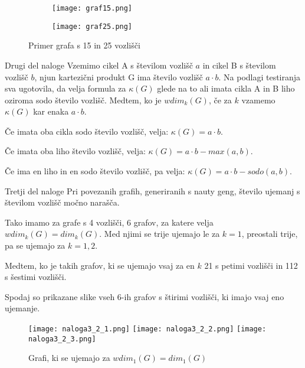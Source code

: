 \documentclass[12pt,a4paper]{amsart}
\makeatletter
\renewcommand\subsection{\@startsection{subsection}{2}%
  \z@{.5\linespacing\@plus.7\linespacing}{.5\linespacing}%
  {\normalfont\scshape}}
\theoremstyle{plain} %
\makeatother
\begin{document}
\bigskip

\bigskip
\begin{figure}[h]
    \centering
    \begin{subfigure}{0.25\textwidth}
    \centering
    \texttt{[image: graf15.png]}
    \end{subfigure}
    \begin{subfigure}{0.25\textwidth}
    \centering
    \texttt{[image: graf25.png]}
    \end{subfigure}
    \caption{Primer grafa s 15 in 25 vozlišči}
    \label{fig:slika2}
\end{figure}%
    
\subsection{Drugi del naloge}
Vzemimo cikel A s številom vozlišč $a$ in cikel B s številom vozlišč $b$, njun kartezični produkt G ima število vozlišč $a \cdot b$. 
Na podlagi testiranja sva ugotovila, da velja formula za $\kappa(G)$ glede na to ali imata cikla A in B liho oziroma sodo število vozlišč. 
Medtem, ko je $wdim_k(G)$, če za $k$ vzamemo $\kappa(G)$ kar enaka $a \cdot b$.

Če imata oba cikla sodo število vozlišč, velja: $\kappa(G) = a \cdot b$.

Če imata oba liho število vozlišč, velja: $\kappa(G) = a \cdot b - max(a,b)$.

Če ima en liho in en sodo število vozlišč, pa velja: $\kappa(G) = a \cdot b - sodo(a,b)$.

\bigskip
\subsection{Tretji del naloge}
Pri povezanih grafih, generiranih s nauty geng, število ujemanj s številom vozlišč močno narašča.

Tako imamo za grafe s 4 vozlišči, 6 grafov, za katere velja $wdim_k(G) = dim_k(G)$.
Med njimi se trije ujemajo le za $k = 1$, preostali trije, pa se ujemajo za $k = 1,2$.

Medtem, ko je takih grafov, ki se ujemajo vsaj za en $k$ 21 s petimi vozlišči in 112 s šestimi vozlišči. 

\bigskip

Spodaj so prikazane slike vseh 6-ih grafov s štirimi vozlišči, ki imajo vsaj eno ujemanje.
\begin{figure}[h]
    \centering
    \texttt{[image: naloga3\_2\_1.png]}
    \texttt{[image: naloga3\_2\_2.png]}
    \texttt{[image: naloga3\_2\_3.png]}
    \caption{Grafi, ki se ujemajo za $wdim_1(G) = dim_1(G)$}
    \label{fig:slika1}
\end{figure}
\bigskip
\end{document}
